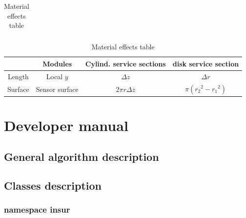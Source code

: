 \documentclass[12pt, a4paper]{article}
\begin{document}
\begin{landscape}
\begin{table}[hbtp]
\begin{minipage}{\textwidth}
\begin{savenotes}
\begin{center}
\begin{tabular}{|c||c|c|c|}
            \hline
          \end{tabular}
        \end{center}
        \begin{center}
          \tiny
          \begin{tabular}{|c|c|c|c|}
            \hline
            & Modules & Cylind. service sections & disk service section \\
            \hline
            Length & Local $y$ & $\Delta z$ & $\Delta r$ \\
            \hline
            Surface & Sensor surface & $2\pi r \Delta z$ & $\pi({r_2}^2 - {r_1}^2)$ \\
            \hline
          \end{tabular}
        \end{center}
      \end{savenotes}
    \end{minipage}
    \caption{Material effects table}
    \label{tab:materialEffect}
  \end{table}
\end{landscape}



\section{Developer manual}\label{sec:developerManual}

\subsection{General algorithm description}






\subsection{Classes description}

\subsubsection{namespace insur}
\end{document}
